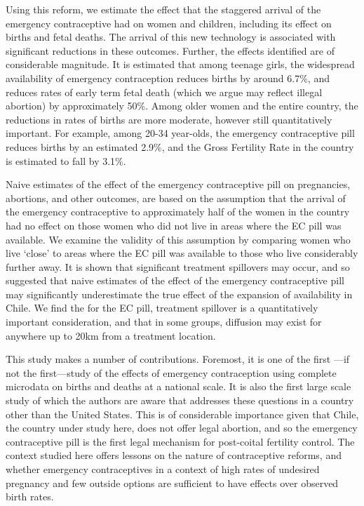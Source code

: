 Using this reform, we estimate the effect that the staggered arrival of the 
emergency contraceptive had on women and children, including its effect on births 
and fetal deaths. The arrival of this new technology is associated with significant 
reductions in these outcomes.  Further, the effects identified are of considerable
magnitude.  It is estimated that among teenage girls, the widespread availability 
of emergency contraception reduces births by around 6.7\%, and reduces rates of early
term fetal death (which we argue may reflect illegal abortion) by approximately 50\%. 
Among older women and the entire country, the reductions in rates of births are more 
moderate, however still quantitatively important.  For example, among 20-34 year-olds,
the emergency contraceptive pill reduces births by an estimated 2.9\%, and the Gross
Fertility Rate in the country is estimated to fall by 3.1\%.
\nocite{Goldin2006, Bailey2011}
\nocite{KearnerLevine2009}
\nocite{Ananatetal2007,ThomasDouglas1996,Levineetal1996}

Naive estimates of the effect of the emergency contraceptive pill on pregnancies,
abortions, and other outcomes, are based on the assumption that the arrival of the
emergency contraceptive to approximately half of the women in the country had no
effect on those women who did not live in areas where the EC pill was available. We
examine the validity of this assumption by comparing women who live `close' to areas
where the EC pill was available to those who live considerably further away.  It is
shown that significant treatment spillovers may occur, and so suggested that naive 
estimates of the effect of the emergency contraceptive pill may significantly 
underestimate the true effect of the expansion of availability in Chile.  We find
the for the EC pill, treatment spillover is a quantitatively important
consideration, and that in some groups, diffusion may exist for anywhere up to 20km
from a treatment location.

This study makes a number of contributions.  Foremost, it is one of the first%
---if not the first---study of the effects of emergency contraception using 
complete microdata on births and deaths at a national scale. It is also the first 
large scale study of which the authors are aware that addresses these questions 
in a country other than the United States.  This is of considerable importance 
given that Chile, the country under study here, does not offer legal abortion, 
and so the emergency contraceptive pill is the first legal mechanism for 
post-coital fertility control.  The context studied here offers lessons on the 
nature of contraceptive reforms, and whether emergency contraceptives in a 
context of high rates of undesired pregnancy and few outside options are 
sufficient to have effects over observed birth rates.

